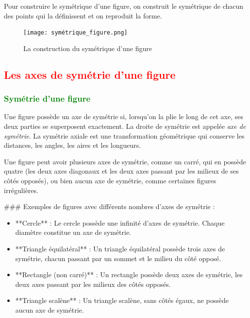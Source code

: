 \documentclass{article}
\begin{document}
\vspace{0.2cm}

Pour construire le symétrique d'une figure, on construit le symétrique de chacun des points qui la définissent et on reproduit la forme.

\begin{figure}[H]
    \centering
    \texttt{[image: symétrique\_figure.png]}
    \caption{La construction du symétrique d'une figure}
    \label{fig:enter-label}
\end{figure}

\subsection{\textcolor{red}{Les axes de symétrie d'une figure}}

\subsubsection{\textcolor{green}{Symétrie d'une figure}}

\vspace{0.2cm}

\begin{tcolorbox}[colback=red!10!white, colframe=red!75!black, title=\textcolor{white}{Définition : Symétrie d'une figure}, sharp corners=south]
    Une figure possède un axe de symétrie si, lorsqu'on la plie le long de cet axe, ses deux parties se superposent exactement. La droite de symétrie est appelée \textit{axe de symétrie}. 
    La symétrie axiale est une transformation géométrique qui conserve les distances, les angles, les aires et les longueurs.
\end{tcolorbox}

\vspace{0.35cm}

Une figure peut avoir plusieurs axes de symétrie, comme un carré, qui en possède quatre (les deux axes diagonaux et les deux axes passant par les milieux de ses côtés opposés), ou bien aucun axe de symétrie, comme certaines figures irrégulières. 

### Exemples de figures avec différents nombres d'axes de symétrie :

\begin{itemize}
    \item **Cercle** : Le cercle possède une infinité d'axes de symétrie. Chaque diamètre constitue un axe de symétrie.
    \item **Triangle équilatéral** : Un triangle équilatéral possède trois axes de symétrie, chacun passant par un sommet et le milieu du côté opposé.
    \item **Rectangle (non carré)** : Un rectangle possède deux axes de symétrie, les deux axes passant par les milieux des côtés opposés.
    \item **Triangle scalène** : Un triangle scalène, sans côtés égaux, ne possède aucun axe de symétrie.
\end{itemize}
\end{document}
